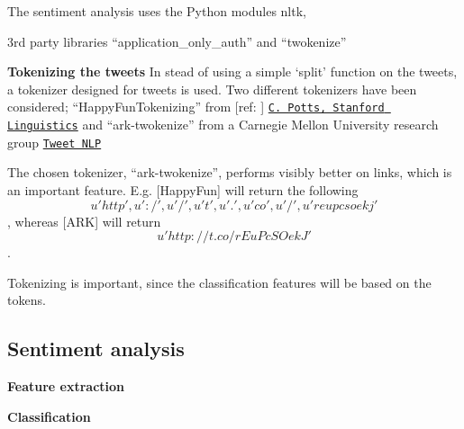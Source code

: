 \documentclass[Main]{subfiles}
\begin{document}



The sentiment analysis uses the Python modules nltk, 

3rd party libraries ``application\_only\_auth'' and ``twokenize''



\textbf{Tokenizing the tweets}
In stead of using a simple `split' function on the tweets, a tokenizer designed for tweets is used. Two different tokenizers have been considered; ``HappyFunTokenizing'' from [ref: ] \href{http://sentiment.christopherpotts.net/tokenizing.html}{\tt C. Potts, Stanford Linguistics} and ``ark-twokenize'' from a Carnegie Mellon University research group \href{http://www.ark.cs.cmu.edu/TweetNLP/}{\tt Tweet NLP}

The chosen tokenizer, ``ark-twokenize'', performs visibly better on links, which is an important feature. E.g. [HappyFun] will return the following 
\[u'http', u':/', u'/', u't', u'.', u'co', u'/', u'reupcsoekj'\], whereas [ARK] will return \[u'http://t.co/rEuPcSOekJ'\].

Tokenizing is important, since the classification features will be based on the tokens. 



\subsection{Sentiment analysis}

\textbf{Feature extraction}


\textbf{Classification}
\end{document}
